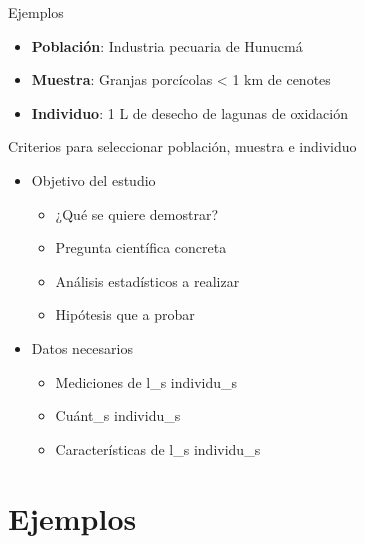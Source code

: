 \documentclass[
  11pt,
  ignorenonframetext,
]{beamer}
\providecommand{\tightlist}{%
  \setlength{\itemsep}{0pt}\setlength{\parskip}{0pt}}
\begin{document}
\begin{frame}{Ejemplos}
\protect\hypertarget{ejemplos-1}{}
\begin{itemize}
\tightlist
\item
  \textbf{Población}: Industria pecuaria de Hunucmá
\item
  \textbf{Muestra}: Granjas porcícolas \textless{} 1 km de cenotes
\item
  \textbf{Individuo}: 1 L de desecho de lagunas de oxidación
\end{itemize}
\end{frame}

\begin{frame}{Criterios para seleccionar población, muestra e individuo}
\protect\hypertarget{criterios-para-seleccionar-poblaciuxf3n-muestra-e-individuo}{}
\begin{itemize}
\item
  Objetivo del estudio

  \begin{itemize}
  \tightlist
  \item
    ¿Qué se quiere demostrar?
  \item
    Pregunta científica concreta
  \item
    Análisis estadísticos a realizar
  \item
    Hipótesis que a probar
  \end{itemize}
\item
  Datos necesarios

  \begin{itemize}
  \tightlist
  \item
    Mediciones de l\_s individu\_s
  \item
    Cuánt\_s individu\_s
  \item
    Características de l\_s individu\_s
  \end{itemize}
\end{itemize}
\end{frame}

\hypertarget{ejemplos-2}{%
\section{Ejemplos}\label{ejemplos-2}}
\end{document}

